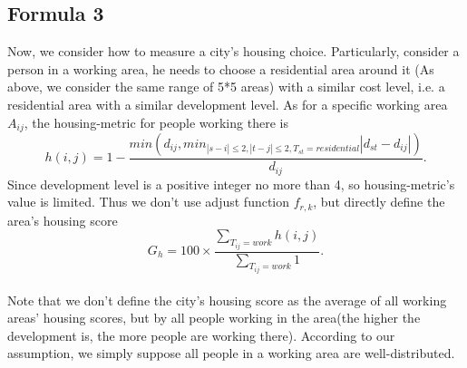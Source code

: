 \subsection{Formula 3}
Now, we consider how to measure a city's housing choice.
Particularly, consider a person in a working area, he needs to choose a residential area around it (As above, we consider the same range of 5*5 areas) with a similar cost level, i.e. a residential area with a similar development level.
As for a specific working area $ A_{ij} $, the housing-metric for people working there is $$ h(i,j) = 1 - \frac{min(d_{ij}, min_{|s-i|\leq 2, |t-j|\leq 2, T_{st}=residential} |d_{st} - d_{ij}|)}{d_{ij}}. $$
Since development level is a positive integer no more than 4, so housing-metric's value is limited.
Thus we don't use adjust function $ f_{r,k} $, but directly define the area's housing score $$ G_h = 100 \times \frac{\sum_{T_{ij}=work} h(i,j)}{\sum_{T_{ij}=work} 1}. $$
\\
Note that we don't define the city's housing score as the average of all working areas' housing scores, but by all people working in the area(the higher the development is, the more people are working there).
According to our assumption, we simply suppose all people in a working area are well-distributed.
\\

